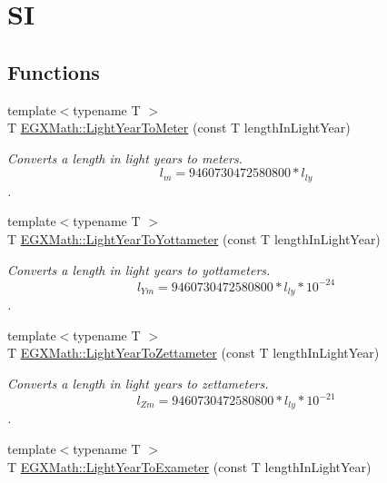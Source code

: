 \hypertarget{group___e_g_x_math-_conversions-_length_conversions-_astronomical-_light_year-_s_i}{}\section{SI}
\label{group___e_g_x_math-_conversions-_length_conversions-_astronomical-_light_year-_s_i}
\subsection*{Functions}
\begin{DoxyCompactItemize}
\item 
{\footnotesize template$<$typename T $>$ }\\T \mbox{\hyperlink{group___e_g_x_math-_conversions-_length_conversions-_astronomical-_light_year-_s_i_ga5475c14ecdd1c3379e891342591cc8e2}{E\+G\+X\+Math\+::\+Light\+Year\+To\+Meter}} (const T length\+In\+Light\+Year)
\begin{DoxyCompactList}\small\item\em Converts a length in light years to meters. \[ l_{m}=9460730472580800 * l_{ly} \]. \end{DoxyCompactList}\item 
{\footnotesize template$<$typename T $>$ }\\T \mbox{\hyperlink{group___e_g_x_math-_conversions-_length_conversions-_astronomical-_light_year-_s_i_ga2b65212eca253e0742a29d3d5f4d7a27}{E\+G\+X\+Math\+::\+Light\+Year\+To\+Yottameter}} (const T length\+In\+Light\+Year)
\begin{DoxyCompactList}\small\item\em Converts a length in light years to yottameters. \[ l_{Ym}=9460730472580800 * l_{ly} * 10^{-24} \]. \end{DoxyCompactList}\item 
{\footnotesize template$<$typename T $>$ }\\T \mbox{\hyperlink{group___e_g_x_math-_conversions-_length_conversions-_astronomical-_light_year-_s_i_gaa73b3b7d9806046fe0e8538c9e46a797}{E\+G\+X\+Math\+::\+Light\+Year\+To\+Zettameter}} (const T length\+In\+Light\+Year)
\begin{DoxyCompactList}\small\item\em Converts a length in light years to zettameters. \[ l_{Zm}=9460730472580800 * l_{ly} * 10^{-21} \]. \end{DoxyCompactList}\item 
{\footnotesize template$<$typename T $>$ }\\T \mbox{\hyperlink{group___e_g_x_math-_conversions-_length_conversions-_astronomical-_light_year-_s_i_gabba57c37044b3b96ab0d58e17dcbac80}{E\+G\+X\+Math\+::\+Light\+Year\+To\+Exameter}} (const T length\+In\+Light\+Year)

\end{DoxyCompactItemize}

